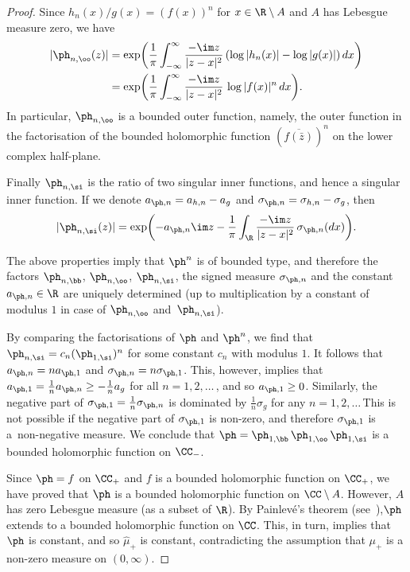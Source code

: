 \begin{proof}
Since $h_n(x) / g(x) = (f(x))^n$ for $x \in \R \setminus A$ and $A$ has Lebesgue measure zero, we have
\begin{align*}
|\ph_{n,\oo}(z)| & = \exp \biggl(\frac{1}{\pi} \int_{-\infty}^\infty \frac{-\im z}{|z - x|^2} \, (\log |h_n(x)| - \log |g(x)|) \, dx \biggr) \\
& = \exp \biggl(\frac{1}{\pi} \int_{-\infty}^\infty \frac{-\im z}{|z - x|^2} \, \log |f(x)|^n \, dx \biggr). 
\end{align*}
In particular, $\ph_{n,\oo}$ is a bounded outer function, namely, the outer function in the factorisation of the bounded holomorphic function $(\overline{f(\bar{z})})^n$ on the lower complex half-plane.

Finally $\ph_{n,\si}$ is the ratio of two singular inner functions, and hence a singular inner function. If we denote $a_{\ph,n} = a_{h,n} - a_g$ and $\sigma_{\ph,n} = \sigma_{h,n} - \sigma_g$, then
\[
|\ph_{n,\si}(z)| = \exp \biggl(-a_{\ph,n} \im z - \frac{1}{\pi} \int_\R \frac{-\im z}{|z - x|^2} \, \sigma_{\ph,n}(dx) \biggr).
\]

The above properties imply that $\ph^n$ is of bounded type, and therefore the factors $\ph_{n,\bb}$, $\ph_{n,\oo}$, $\ph_{n,\si}$, the signed measure $\sigma_{\ph,n}$ and the constant $a_{\ph,n} \in \R$ are uniquely determined (up to multiplication by a constant of modulus $1$ in case of $\ph_{n,\oo}$ and~$\ph_{n,\si}$).

By comparing the factorisations of $\ph$ and $\ph^n$, we find that $\ph_{n,\si} = c_n (\ph_{1,\si})^n$ for some constant $c_n$ with modulus $1$. It follows that $a_{\ph,n} = n a_{\ph,1}$ and $\sigma_{\ph,n} = n \sigma_{\ph,1}$. This, however, implies that $a_{\ph,1} = \tfrac{1}{n} a_{\ph,n} \ge - \tfrac{1}{n} a_g$ for all $n = 1, 2, \ldots$\,, and so $a_{\ph,1} \ge 0$. Similarly, the negative part of $\sigma_{\ph,1} = \tfrac{1}{n} \sigma_{\ph,n}$ is dominated by $\tfrac{1}{n} \sigma_g$ for any $n = 1, 2, \ldots\,$This is not possible if the negative part of $\sigma_{\ph,1}$ is non-zero, and therefore $\sigma_{\ph,1}$ is a~non-negative measure. We conclude that $\ph = \ph_{1,\bb}\,\ph_{1,\oo}\,\ph_{1,\si}$ is a bounded holomorphic function on $\CC_-$.

Since $\ph = f$ on $\CC_+$ and $f$ is a bounded holomorphic function on $\CC_+$, we have proved that $\ph$ is a bounded holomorphic function on $\CC \setminus A$. However, $A$ has zero Lebesgue measure (as a subset of $\R$). By Painlevé's theorem (see~\cite[Theorem~2.7]{bib:y15}),\linebreak$\ph$ extends to a bounded holomorphic function on $\CC$. This, in turn, implies that $\ph$ is constant, and so $\hat\mu_+$ is constant, contradicting the assumption that $\mu_+$ is a non-zero measure on $(0, \infty)$.
\end{proof}

